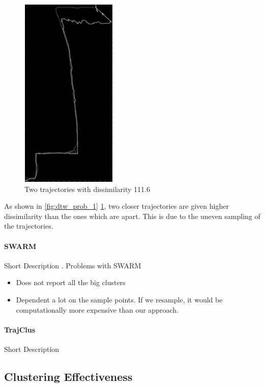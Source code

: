 \begin{figure}[H]
\centering     
\includegraphics[scale=0.8]{figs/dtw_probs_1_2.jpg}
\caption{Two trajectories with dissimilarity 111.6}
\label{fig:dtw_prob_2}  
\end{figure} 

As shown in \ref{fig:dtw_prob_1} \ref{fig:dtw_prob_2}, two closer trajectories are given higher dissimilarity than the ones which are apart. This is due to the uneven sampling of the trajectories. 

\paragraph{SWARM}
\par Short Description . 
Problems with SWARM 
\begin{itemize}
\item Does not report all the big clusters
\item Dependent a lot on the sample points. If we resample, it would be computationally more expensive than our approach.
\end{itemize}

\paragraph{TrajClus}
\par Short Description 

\subsection{Clustering Effectiveness}

